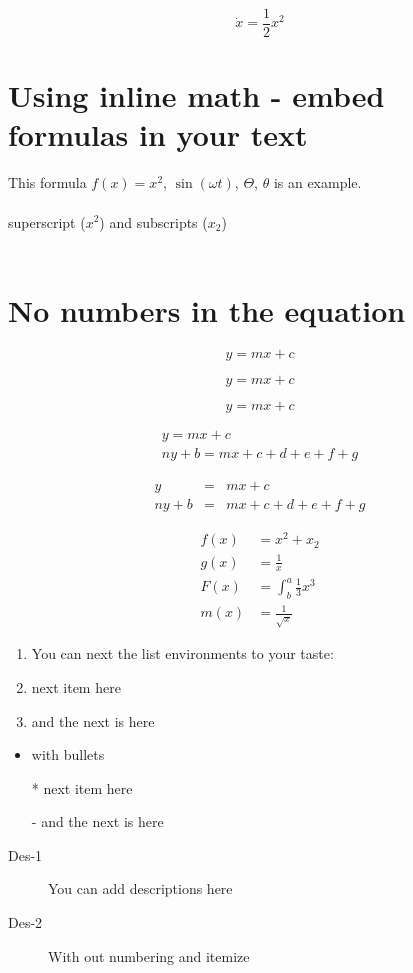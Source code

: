 \documentclass{article}
\begin{document}
\begin{equation}
  \dot{x} = \frac{1}{2}x^2 \nonumber
\end{equation}

\section{Using inline math - embed formulas in your text}
This formula $f(x) = x^2$, $\sin(\omega t)$, $\Theta$, $\theta$  is an example.
\\~\\
superscript ($x^2$) and subscripts ($x_2$)
\\~\\


\section{No numbers in the equation}

\begin{equation}
  y = m x + c 
\end{equation}  

\begin{equation}
    y = m x + c  \nonumber
\end{equation}

\begin{equation*}
    y = m x + c 
\end{equation*}

\begin{eqnarray}
    y = m x + c \\ 
     ny+b = m x + c +d +e +f +g 
\end{eqnarray}

\begin{eqnarray}
    y &=& m x + c \\ 
     ny+b &=& m x + c +d +e +f +g 
\end{eqnarray}

\begin{eqnarray}
 f(x) &= x^2+x_2\\
  g(x) &= \frac{1}{x}\\
  F(x) &= \int^a_b \frac{1}{3}x^3 \\
  m(x) &=\frac{1}{\sqrt{x}}
\end{eqnarray}  

\begin{enumerate}
\item You can next the list environments to your taste:
\item next item here
\item and the next is here
\end{enumerate}


\begin{itemize}
\item with bullets
\item[*] next item here
\item[-] and the next is here
\end{itemize}

\begin{description}
\item[Des-1] You can add descriptions here
\item[Des-2] With out numbering and itemize
\end{description}
\end{document}
